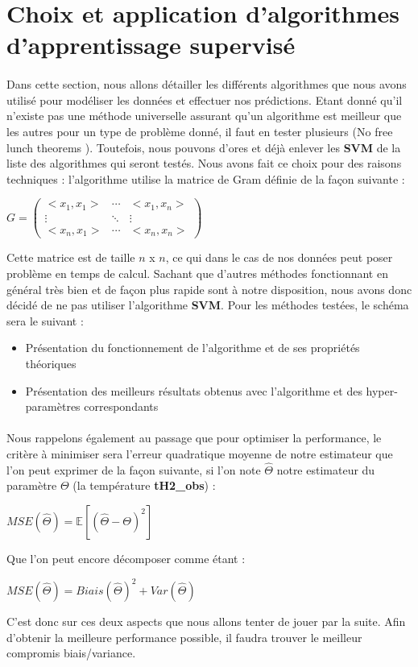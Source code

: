 \documentclass[14pt, openany]{article}
\begin{document}
\section{Choix et application d'algorithmes d'apprentissage supervisé}
\paragraph{}
Dans cette section, nous allons détailler les différents algorithmes que nous avons utilisé pour modéliser les données et effectuer nos prédictions. Etant donné qu'il n'existe pas une méthode universelle assurant qu'un algorithme est meilleur que les autres pour un type de problème donné, il faut en tester plusieurs (\og No free lunch theorems \fg{}). Toutefois, nous pouvons d'ores et déjà enlever les \textbf{SVM} de la liste des algorithmes qui seront testés. Nous avons fait ce choix pour des raisons techniques : l'algorithme utilise la matrice de Gram définie de la façon suivante :
\begin{center}
$G = \begin{pmatrix} <x_1,x_1> & \cdots & <x_1,x_n> \\ \vdots & \ddots & \vdots \\ <x_n,x_1> & \cdots & <x_n,x_n> \end{pmatrix}$
\end{center}
Cette matrice est de taille $n$ x $n$, ce qui dans le cas de nos données peut poser problème en temps de calcul. Sachant que d'autres méthodes fonctionnant en général très bien et de façon plus rapide sont à notre disposition, nous avons donc décidé de ne pas utiliser l'algorithme \textbf{SVM}. Pour les méthodes testées, le schéma sera le suivant :
\begin{itemize}
\item Présentation du fonctionnement de l'algorithme et de ses propriétés théoriques
\item Présentation des meilleurs résultats obtenus avec l'algorithme et des hyper-paramètres correspondants
\end{itemize}
\paragraph{}
Nous rappelons également au passage que pour optimiser la performance, le critère à minimiser sera l'erreur quadratique moyenne de notre estimateur que l'on peut exprimer de la façon suivante, si l'on note $\hat{\Theta}$ notre estimateur du paramètre $\Theta$ (la température \textbf{tH2\_obs}) :
\begin{center}
$MSE(\hat{\Theta})=\mathbb{E}[(\hat{\Theta}-\Theta)^2]$
\end{center}
Que l'on peut encore décomposer comme étant :
\begin{center}
$MSE(\hat{\Theta})=Biais(\hat{\Theta})^2+Var(\hat{\Theta})$
\end{center}
C'est donc sur ces deux aspects que nous allons tenter de jouer par la suite. Afin d'obtenir la \og meilleure \fg{} performance possible, il faudra trouver le \og meilleur \fg{} compromis biais/variance.
\end{document}
